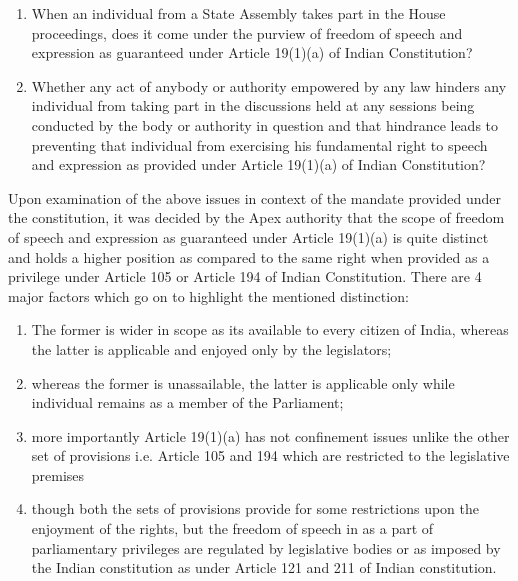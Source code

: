 \begin{multicols}{2}
\vspace{-.3cm}

\begin{enumerate}
\item When an individual from a State Assembly takes part in the House proceedings,
does it come under the purview of freedom of speech and expression as guaranteed
under Article 19(1)(a) of Indian Constitution?

\item Whether any act of anybody or authority empowered by any law hinders any
individual from taking part in the discussions held at any sessions being conducted
by the body or authority in question and that hindrance leads to preventing that
individual from exercising his fundamental right to speech and expression as
provided under Article 19(1)(a) of Indian Constitution?
\end{enumerate}

\newpage

\noi
Upon examination of the above issues in context of the mandate provided under the
constitution, it was decided by the Apex authority that the scope of freedom of speech and
expression as guaranteed under Article 19(1)(a) is quite distinct and holds a higher position as
compared to the same right when provided as a privilege under Article 105 or Article 194 of
Indian Constitution. There are 4 major factors which go on to highlight the mentioned
distinction:

\begin{enumerate}[label=$\bullet$]
\itemsep=0pt
\item The former is wider in scope as its available to every citizen of India, whereas the
latter is applicable and enjoyed only by the legislators;

\item  whereas the former is unassailable, the latter is applicable only while individual
remains as a member of the Parliament;

\item more importantly Article 19(1)(a) has not confinement issues unlike the other set of
provisions i.e. Article 105 and 194 which are restricted to the legislative premises

\item though both the sets of provisions provide for some restrictions upon the enjoyment
of the rights, but the freedom of speech in as a part of parliamentary privileges are
regulated by legislative bodies or as imposed by the Indian constitution as under
Article 121 and 211 of Indian constitution.
\end{enumerate}


\end{multicols}
